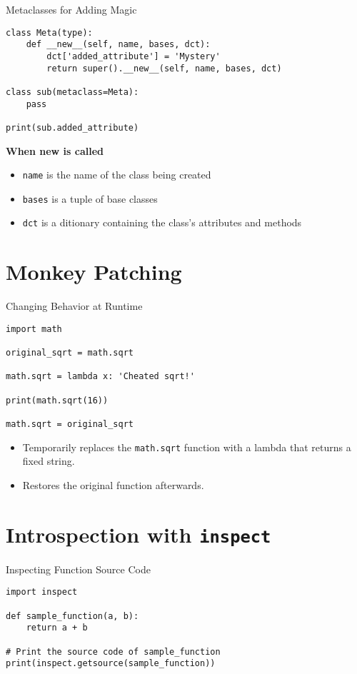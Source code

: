 \documentclass{beamer}
\begin{document}
\begin{frame}[fragile]{Metaclasses for Adding Magic}
\begin{lstlisting}
class Meta(type):
    def __new__(self, name, bases, dct):
        dct['added_attribute'] = 'Mystery'
        return super().__new__(self, name, bases, dct)

class sub(metaclass=Meta):
    pass

print(sub.added_attribute)
\end{lstlisting}
\vspace{1em}
\textbf{When new is called}
\begin{itemize}
    \item \texttt{name} is the name of the class being created
    \item \texttt{bases} is a tuple of base classes
    \item \texttt{dct} is a ditionary containing the class's attributes and methods
\end{itemize}
\end{frame}

\section{Monkey Patching}
\begin{frame}[fragile]{Changing Behavior at Runtime}
\begin{lstlisting}
import math

original_sqrt = math.sqrt

math.sqrt = lambda x: 'Cheated sqrt!'

print(math.sqrt(16))

math.sqrt = original_sqrt
\end{lstlisting}
\vspace{1em}
 
\begin{itemize}
  \item Temporarily replaces the \texttt{math.sqrt} function with a lambda that returns a fixed string.
  \item Restores the original function afterwards.
\end{itemize}
\end{frame}

\section{Introspection with \texttt{inspect}}
\begin{frame}[fragile]{Inspecting Function Source Code}
\begin{lstlisting}
import inspect

def sample_function(a, b):
    return a + b

# Print the source code of sample_function
print(inspect.getsource(sample_function))
\end{lstlisting}
\vspace{1em}
\end{frame}
\end{document}
